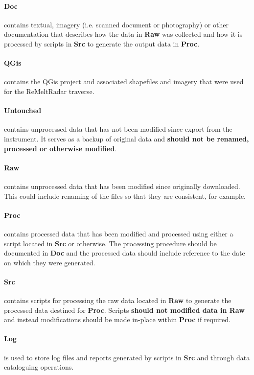 \documentclass[a4paper]{article}
\begin{document}
\paragraph{Doc}
contains textual, imagery (i.e. scanned document or photography) or other 
documentation that describes how the data in \textbf{Raw} was collected
and how it is processed by scripts in \textbf{Src} to generate the output
data in \textbf{Proc}.

\paragraph{QGis}
contains the QGis project and associated shapefiles and imagery that were 
used for the ReMeltRadar traverse.

\paragraph{Untouched}
contains unprocessed data that has not been modified since export from the
instrument.  It serves as a backup of original data and \textbf{should not
be renamed, processed or otherwise modified}.

\paragraph{Raw}
contains unprocessed data that has been modified since originally downloaded.
This could include renaming of the files so that they are consistent, for
example.

\paragraph{Proc}
contains processed data that has been modified and processed using either
a script located in \textbf{Src} or otherwise.  The processing procedure
should be documented in \textbf{Doc} and the processed data should include
reference to the date on which they were generated.

\paragraph{Src}
contains scripts for processing the raw data located in \textbf{Raw} to 
generate the processed data destined for \textbf{Proc}.  Scripts 
\textbf{should not modified data in Raw} and instead modifications should
be made in-place within \textbf{Proc} if required.

\paragraph{Log}
is used to store log files and reports generated by scripts in \textbf{Src}
and through data cataloguing operations.
\end{document}
